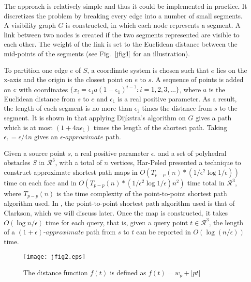 \documentclass{llncs}
\begin{document}
The approach is relatively simple and thus it could be implemented in practice. It discretizes the
problem by breaking every edge into a number of small segments. A visibility graph $G$ is constructed,
in which each node represents a segment. A link between two nodes is created if the two segments
represented are visible to each other. The weight of the link is set to the Euclidean distance between
the mid-points of the segments (see Fig.~\ref{jfig1} for an illustration).



To partition one edge $e$ of $S$, a coordinate system is chosen such that $e$ lies on the x-axis and the
origin is the closest point on $e$ to $s$. A sequence of points is added on $e$ with coordinates
$\{x_i=\epsilon_1a(1+\epsilon_1)^{i-1}:i=1,2,3,\ldots\}$, where $a$ is the Euclidean distance from
$s$ to $e$ and $\epsilon_1$ is a real positive parameter. As a result, the length of each segment is
no more than $\epsilon_1$ times the distance from $s$ to the segment. It is shown in \cite{Pap85}
that applying Dijkstra's algorithm on $G$ gives a path which is at most $(1+4n\epsilon_1)$ times the
length of the shortest path. Taking $\epsilon_1=\epsilon/4n$ gives an $\epsilon$-$approximate$ path.



Given a source point $s$, a real positive parameter $\epsilon$, and a set of polyhedral obstacles $S$ in $\mathcal{R}^3$, with a total of $n$ vertices,
Har-Peled \cite{Sar99} presented a technique to construct approximate shortest path maps in $O(T_{p-p}(n)*(1/\epsilon^2\log1/\epsilon))$ time on each face and in $O(T_{p-p}(n)*(1/\epsilon^2\log1/\epsilon)n^2)$ time total in $\mathcal{R}^3$, where $T_{p-p}(n)$ is the time complexity of the point-to-point shortest path
algorithm used. In \cite{Sar99}, the point-to-point shortest path
algorithm used is that of Clarkson\cite{Clar87}, which we will discuss later.
Once the map is constructed, it takes $O(\log n/\epsilon)$
time for each query, that is, given a query point $t\in\mathcal{R}^3$, the length of a
$(1+\epsilon)$-$approximate$ path
from $s$ to $t$ can be reported in $O(\log (n/\epsilon))$ time.

\begin{figure}\begin{center}
    \leavevmode
\texttt{[image: jfig2.eps]}
    \caption{The distance function $f(t)$ is defined as $f(t)=w_{p}+|pt|$}
    \label{jfig2}
    \end{center}
\end{figure}
\end{document}
